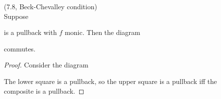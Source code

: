 \documentclass[a4paper]{article}
\begin{document}
\begin{lemma} (7.8, Beck-Chevalley condition)\\
    Suppose


    is a pullback with $f$ monic. Then the diagram 


    commutes.
    \begin{proof}
        Consider the diagram


        The lower square is a pullback, so the upper square is a pullback iff the composite is a pullback.
    \end{proof}
\end{lemma}
\end{document}
